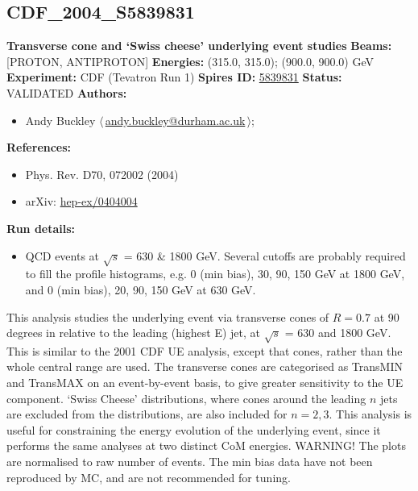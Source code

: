 \clearpage


\clearpage

\subsection[CDF\_2004\_S5839831]{CDF\_2004\_S5839831\,\cite{Acosta:2004wqa}}
\textbf{Transverse cone and `Swiss cheese' underlying event studies}\newline
\textbf{Beams:} [PROTON, ANTIPROTON] \newline
\textbf{Energies:} (315.0, 315.0); (900.0, 900.0) GeV \newline
\textbf{Experiment:} CDF (Tevatron Run 1) \newline
\textbf{Spires ID:} \href{http://www.slac.stanford.edu/spires/find/hep/www?rawcmd=key+5839831}{5839831}\newline
\textbf{Status:} VALIDATED\newline
\textbf{Authors:}
\begin{itemize}
  \item Andy Buckley $\langle\,$\href{mailto:andy.buckley@durham.ac.uk}{andy.buckley@durham.ac.uk}$\,\rangle$;
\end{itemize}
\textbf{References:}
\begin{itemize}
  \item Phys. Rev. D70, 072002 (2004)
  \item arXiv: \href{http://arxiv.org/abs/hep-ex/0404004}{hep-ex/0404004}
\end{itemize}
\textbf{Run details:}
\begin{itemize}

  \item QCD events at \ensuremath{\sqrt{s}} = 630 \& 1800 GeV. Several \pTmin cutoffs are probably required to fill the profile histograms, e.g. 0 (min bias), 30, 90, 150 GeV at 1800 GeV, and 0 (min bias), 20, 90, 150 GeV at 630 GeV.\end{itemize}

\noindent This analysis studies the underlying event via transverse cones of  $R = 0.7$ at 90 degrees in \phi relative to the leading (highest E) jet, at \ensuremath{\sqrt{s}} = 630 and 1800 GeV. This is similar to the 2001 CDF UE analysis, except that cones, rather than the whole central \eta range are used. The transverse cones are categorised as TransMIN and TransMAX on an event-by-event basis, to give greater sensitivity to the UE component.
`Swiss Cheese' distributions, where cones around the leading $n$ jets are excluded from the distributions, are also included for $n = 2, 3$.  This analysis is useful for constraining the energy evolution of the underlying event, since it performs the same analyses at two distinct CoM energies.
WARNING! The \pT plots are normalised to raw number of events. The min bias data have not been reproduced by MC, and are not recommended for tuning.


